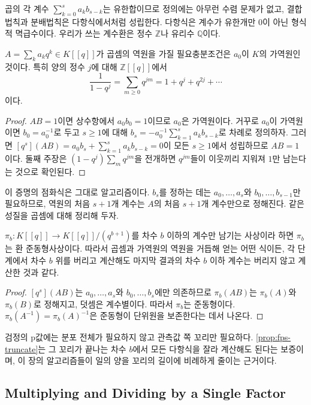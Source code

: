 곱의 각 계수 $\sum_{k=0}^sa_kb_{s-k}$는 유한합이므로 정의에는 아무런 수렴 문제가 없고, 결합법칙과 분배법칙은 다항식에서처럼 성립한다. 다항식은 계수가 유한개만 $0$이 아닌 형식적 멱급수이다. 우리가 쓰는 계수환은 정수 $\mathbb Z$나 유리수 $\mathbb Q$이다.

\begin{proposition}
\label{prop:fps-inverse}
$A=\sum_ka_kq^k\in K[[q]]$가 곱셈의 역원을 가질 필요충분조건은 $a_0$이 $K$의 가역원인 것이다. 특히 양의 정수 $j$에 대해 $\mathbb Z[[q]]$에서
\[
\frac1{1-q^j}=\sum_{m\ge0}q^{jm}=1+q^j+q^{2j}+\cdots
\]
이다.
\end{proposition}

\begin{proof}
$AB=1$이면 상수항에서 $a_0b_0=1$이므로 $a_0$은 가역원이다. 거꾸로 $a_0$이 가역원이면 $b_0=a_0^{-1}$로 두고 $s\ge1$에 대해 $b_s=-a_0^{-1}\sum_{k=1}^sa_kb_{s-k}$로 차례로 정의하자. 그러면 $[q^s](AB)=a_0b_s+\sum_{k=1}^sa_kb_{s-k}=0$이 모든 $s\ge1$에서 성립하므로 $AB=1$이다. 둘째 주장은 $(1-q^j)\sum_mq^{jm}$을 전개하면 $q^{jm}$들이 이웃끼리 지워져 $1$만 남는다는 것으로 확인된다.
\end{proof}

이 증명의 점화식은 그대로 알고리즘이다. $b_s$를 정하는 데는 $a_0,\dots,a_s$와 $b_0,\dots,b_{s-1}$만 필요하므로, 역원의 처음 $s+1$개 계수는 $A$의 처음 $s+1$개 계수만으로 정해진다. 같은 성질을 곱셈에 대해 정리해 두자.

\begin{proposition}
\label{prop:fps-truncate}
$\pi_b:K[[q]]\to K[[q]]/(q^{b+1})$를 차수 $b$ 이하의 계수만 남기는 사상이라 하면 $\pi_b$는 환 준동형사상이다. 따라서 곱셈과 가역원의 역원을 거듭해 얻는 어떤 식이든, 각 단계에서 차수 $b$ 위를 버리고 계산해도 마지막 결과의 차수 $b$ 이하 계수는 버리지 않고 계산한 것과 같다.
\end{proposition}

\begin{proof}
$[q^s](AB)$는 $a_0,\dots,a_s$와 $b_0,\dots,b_s$에만 의존하므로 $\pi_b(AB)$는 $\pi_b(A)$와 $\pi_b(B)$로 정해지고, 덧셈은 계수별이다. 따라서 $\pi_b$는 준동형이다. $\pi_b(A^{-1})=\pi_b(A)^{-1}$은 준동형이 단위원을 보존한다는 데서 나온다.
\end{proof}

검정의 p값에는 분포 전체가 필요하지 않고 관측값 쪽 꼬리만 필요하다. \cref{prop:fps-truncate}는 그 꼬리가 끝나는 차수 $b$에서 모든 다항식을 잘라 계산해도 된다는 보증이며, 이 장의 알고리즘들이 일의 양을 꼬리의 길이에 비례하게 줄이는 근거이다.

\subsection{Multiplying and Dividing by a Single Factor}

